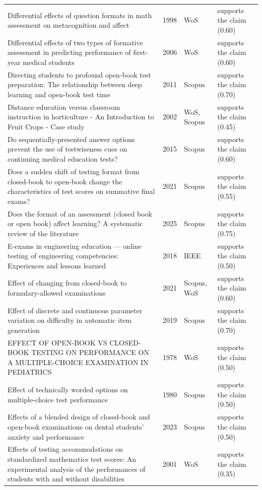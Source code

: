 \begin{longtable}{@{}%
  >{\raggedright\arraybackslash}p{}c%
  >{\raggedright\arraybackslash}p{}%
  >{\raggedright\arraybackslash}p{}@{}}
Differential effects of question formats in math assessment on metacognition and affect & 1998 & WoS & supports the claim (0.60) \\
Differential effects of two types of formative assessment in predicting performance of first-year medical students & 2006 & WoS & supports the claim (0.60) \\
Directing students to profound open-book test preparation: The relationship between deep learning and open-book test time & 2011 & Scopus & supports the claim (0.70) \\
Distance education versus classroom instruction in horticulture - An Introduction to Fruit Crops - Case study & 2002 & WoS, Scopus & supports the claim (0.45) \\
Do sequentially-presented answer options prevent the use of testwiseness cues on continuing medical education tests? & 2015 & Scopus & supports the claim (0.60) \\
Does a sudden shift of testing format from closed-book to open-book change the characteristics of test scores on summative final exams? & 2021 & Scopus & supports the claim (0.55) \\
Does the format of an assessment (closed book or open book) affect learning? A systematic review of the literature & 2025 & Scopus & supports the claim (0.75) \\
E-exams in engineering education --- online testing of engineering competencies: Experiences and lessons learned & 2018 & IEEE & supports the claim (0.50) \\
Effect of changing from closed-book to formulary-allowed examinations & 2021 & Scopus, WoS & supports the claim (0.60) \\
Effect of discrete and continuous parameter variation on difficulty in automatic item generation & 2019 & Scopus & supports the claim (0.70) \\
EFFECT OF OPEN-BOOK VS CLOSED-BOOK TESTING ON PERFORMANCE ON A MULTIPLE-CHOICE EXAMINATION IN PEDIATRICS & 1978 & WoS & supports the claim (0.50) \\
Effect of technically worded options on multiple-choice test performance & 1980 & Scopus & supports the claim (0.50) \\
Effects of a blended design of closed-book and open-book examinations on dental students' anxiety and performance & 2023 & Scopus & supports the claim (0.50) \\
Effects of testing accommodations on standardized mathematics test scores: An experimental analysis of the performances of students with and without disabilities & 2001 & WoS & supports the claim (0.35) \\

\end{longtable}
